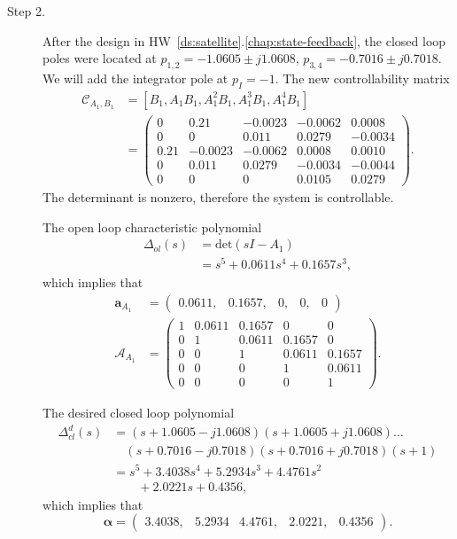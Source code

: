\begin{description}
\item[Step 2.] 
After the design in HW~\ref{ds:satellite}.\ref{chap:state-feedback}, the closed loop poles were located at 
$p_{1,2} = -1.0605 \pm j 1.0608$, 
$p_{3,4}=  -0.7016 \pm j 0.7018$.
We will add the integrator pole at $p_I=-1$.
The new controllability matrix
\begin{align*}
\mathcal{C}_{A_1,B_1} &= [B_1, A_1B_1, A_1^2B_1, A_1^3B_1, A_1^4B_1] \\
&= \begin{pmatrix} 
         0 &   0.21 &  -0.0023 &  -0.0062 &   0.0008 \\
         0 &        0 &   0.011 &   0.0279 &  -0.0034 \\
    0.21 &  -0.0023 &  -0.0062 &   0.0008 &   0.0010 \\
         0 &   0.011 &   0.0279 &  -0.0034 &  -0.0044 \\
         0 &        0 &        0 &   0.0105 &   0.0279 
         \end{pmatrix}.
\end{align*}
The determinant is nonzero, therefore the system is controllable.  

The open loop characteristic polynomial
\begin{align*}
\Delta_{ol}(s)&=\text{det}(sI-A_1) \\
&= s^5 + 0.0611 s^4 + 0.1657 s^3,
\end{align*}
which implies that
\begin{align*}
\mathbf{a}_{A_1} &= \begin{pmatrix}0.0611,  &   0.1657,   &       0,   &       0,     &     0\end{pmatrix} \\
\mathcal{A}_{A_1} &= \begin{pmatrix} 
1 & 0.0611 &    0.1657 &         0 &        0 \\ 
0 & 1 & 0.0611 &    0.1657 &         0 \\ 
0 & 0 & 1 & 0.0611 &    0.1657 \\
0 & 0 & 0 & 1 & 0.0611 \\
0 & 0 & 0 & 0 & 1
\end{pmatrix}.
\end{align*}

The desired closed loop polynomial
\begin{align*}
\Delta_{cl}^d(s) &= (s+1.0605 - j1.0608)(s+1.0605 +j1.0608)\dots \\
&\quad
(s+0.7016-j0.7018)(s+0.7016+j0.7018)
(s+1) \\
&=s^5+3.4038 s^4+5.2934 s^3+4.4761 s^2 \\ &\qquad +2.0221 s+0.4356,
\end{align*}
which implies that
\[
\boldsymbol{\alpha} = \begin{pmatrix} 3.4038, &    5.2934 &    4.4761, &    2.0221, &    0.4356\end{pmatrix}.
\]


\end{description}
